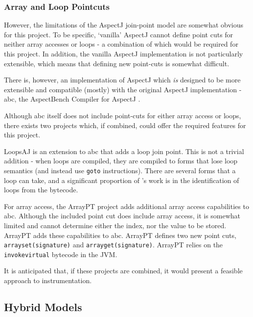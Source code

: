                 \subsubsection{Array and Loop Pointcuts} \label{sec:instrumentation/aop/aspectj/arrayloop}
                However, the limitations of the AspectJ join-point model are somewhat obvious for this project. To be specific, `vanilla' AspectJ cannot define point cuts for neither array accesses or loops - a combination of which would be required for this project. In addition, the vanilla AspectJ implementation is not particularly extensible, which means that defining new point-cuts is somewhat difficult.

                There is, however, an implementation of AspectJ which \emph{is} designed to be more extensible and compatible (mostly) with the original AspectJ implementation - abc, the AspectBench Compiler for AspectJ \citep{Allan2005}.

                Although abc itself does not include point-cuts for either array access or loops, there exists two projects which, if combined, could offer the required features for this project.

                LoopsAJ \citep{Harbulot2005} is an extension to abc that adds a loop join point. This is not a trivial addition - when loops are compiled, they are compiled to forms that lose loop semantics (and instead use \texttt{goto} instructions). There are several forms that a loop can take, and a significant proportion of \citeauthor{Harbulot2005}'s work is in the identification of loops from the bytecode.

                For array access, the ArrayPT project \citep{Chen2007} adds additional array access capabilities to abc. Although the included point cut does include array access, it is somewhat limited and cannot determine either the index, nor the value to be stored. ArrayPT adds these capabilities to abc. ArrayPT defines two new point cuts, \texttt{arrayset(signature)} and \texttt{arrayget(signature)}. ArrayPT relies on the \texttt{invokevirtual} bytecode in the JVM.

                It is anticipated that, if these projects are combined, it would present a feasible approach to instrumentation.

        \subsection{Hybrid Models} \label{sec:instrumentation/hybrid}
